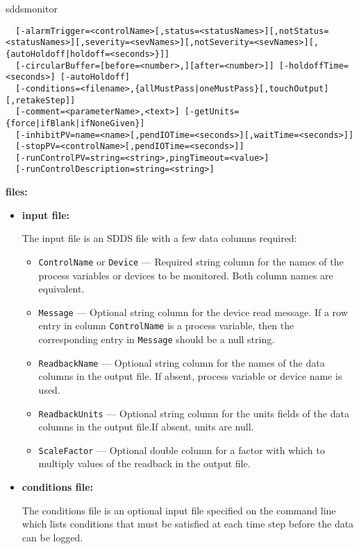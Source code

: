 \begin{sddsprog}{sddsmonitor}
\begin{verbatim}
  [-alarmTrigger=<controlName>[,status=<statusNames>][,notStatus=<statusNames>][,severity=<sevNames>][,notSeverity=<sevNames>][,{autoHoldoff|holdoff=<seconds>}]]
  [-circularBuffer=[before=<number>,][after=<number>]] [-holdoffTime=<seconds>] [-autoHoldoff]
  [-conditions=<filename>,{allMustPass|oneMustPass}[,touchOutput][,retakeStep]]
  [-comment=<parameterName>,<text>] [-getUnits={force|ifBlank|ifNoneGiven}]
  [-inhibitPV=name=<name>[,pendIOTime=<seconds>][,waitTime=<seconds>]]
  [-stopPV=<controlName>[,pendIOTime=<seconds>]]
  [-runControlPV=string=<string>,pingTimeout=<value>]
  [-runControlDescription=string=<string>]
\end{verbatim}
\item {\bf files:}
\begin{itemize}
\item {\bf input file:}\par
The input file is an SDDS file with a few data columns required:
\begin{itemize}
        \item {\tt ControlName} or {\tt Device} --- Required string column for the names of the process variables
                or devices to be monitored. Both column names are equivalent.
        \item {\tt Message} --- Optional string column for the device read message. If a row entry in
                column {\tt ControlName} is a process variable, then the corresponding entry
                in {\tt Message} should be a null string. 
        \item {\tt ReadbackName} --- Optional string column for the names of the data columns in the 
                output file. If absent, process variable or device name is used.
        \item {\tt ReadbackUnits} --- Optional string column for the units fields of the data columns in the 
                output file.If absent, units are null.
        \item {\tt ScaleFactor} --- Optional double column for a factor with which to multiply
                values of the readback in the output file.
\end{itemize}

\item {\bf conditions file:} \par
The conditions file is an optional input file specified on the command line which lists
conditions that must be satisfied at each time step before the data can be logged.


\end{itemize}
\end{sddsprog}
